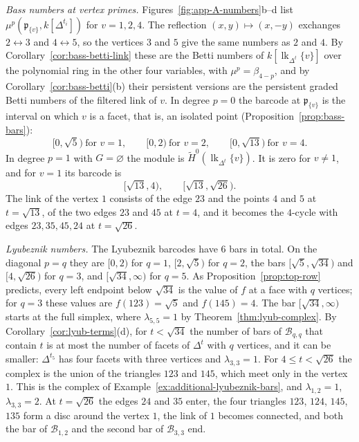 \documentclass[11pt]{article}
\theoremstyle{plain}
\theoremstyle{definition}
\begin{document}
\emph{Bass numbers at vertex primes.} Figures~\ref{fig:app-A-numbers}b--d list $\mu^p(\mathfrak{p}_{\{v\}},k[\Delta^{t_i}])$ for $v=1,2,4$. The reflection $(x,y)\mapsto(x,-y)$ exchanges $2\leftrightarrow3$ and $4\leftrightarrow5$, so the vertices $3$ and $5$ give the same numbers as $2$ and $4$. By Corollary~\ref{cor:bass-betti-link} these are the Betti numbers of $k[\operatorname{lk}_{\Delta^t}\{v\}]$ over the polynomial ring in the other four variables, with $\mu^p=\beta_{4-p}$, and by Corollary~\ref{cor:bass-betti}(b) their persistent versions are the persistent graded Betti numbers of the filtered link of $v$. In degree $p=0$ the barcode at $\mathfrak{p}_{\{v\}}$ is the interval on which $v$ is a facet, that is, an isolated point (Proposition~\ref{prop:bass-bars}):
\[
 [0,\sqrt5)\ \text{for } v=1,\qquad [0,2)\ \text{for } v=2,\qquad [0,\sqrt{13})\ \text{for } v=4 .
\]
In degree $p=1$ with $G=\varnothing$ the module is $\widetilde{H}^0(\operatorname{lk}_{\Delta^t}\{v\})$. It is zero for $v\ne1$, and for $v=1$ its barcode is
\[
 [\sqrt{13},4),\qquad[\sqrt{13},\sqrt{26}) .
\]
The link of the vertex $1$ consists of the edge $23$ and the points $4$ and $5$ at $t=\sqrt{13}$, of the two edges $23$ and $45$ at $t=4$, and it becomes the $4$-cycle with edges $23,35,45,24$ at $t=\sqrt{26}$.

\emph{Lyubeznik numbers.} The Lyubeznik barcodes have $6$ bars in total. On the diagonal $p=q$ they are $[0,2)$ for $q=1$, $[2,\sqrt5)$ for $q=2$, the bars $[\sqrt5,\sqrt{34})$ and $[4,\sqrt{26})$ for $q=3$, and $[\sqrt{34},\infty)$ for $q=5$. As Proposition~\ref{prop:top-row} predicts, every left endpoint below $\sqrt{34}$ is the value of $f$ at a face with $q$ vertices; for $q=3$ these values are $f(123)=\sqrt5$ and $f(145)=4$. The bar $[\sqrt{34},\infty)$ starts at the full simplex, where $\lambda_{5,5}=1$ by Theorem~\ref{thm:lyub-complex}. By Corollary~\ref{cor:lyub-terms}(d), for $t<\sqrt{34}$ the number of bars of $\mathcal B_{q,q}$ that contain $t$ is at most the number of facets of $\Delta^t$ with $q$ vertices, and it can be smaller: $\Delta^{t_5}$ has four facets with three vertices and $\lambda_{3,3}=1$. For $4\le t<\sqrt{26}$ the complex is the union of the triangles $123$ and $145$, which meet only in the vertex $1$. This is the complex of Example~\ref{ex:additional-lyubeznik-bars}, and $\lambda_{1,2}=1$, $\lambda_{3,3}=2$. At $t=\sqrt{26}$ the edges $24$ and $35$ enter, the four triangles $123$, $124$, $145$, $135$ form a disc around the vertex $1$, the link of $1$ becomes connected, and both the bar of $\mathcal B_{1,2}$ and the second bar of $\mathcal B_{3,3}$ end.
\end{document}
